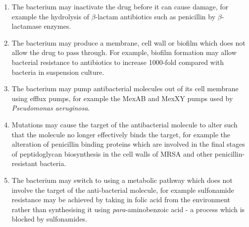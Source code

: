\begin{enumerate}
\item The bacterium may inactivate the drug before it can cause damage, for example the hydrolysis of $\beta$-lactam antibiotics such as penicillin by $\beta$-lactamase enzymes.

\item The bacterium may produce a membrane, cell wall or biofilm which does not allow the drug to pass through. For example, biofilm formation may allow bacterial resistance to antibiotics to increase 1000-fold compared with bacteria in suspension culture\cite{Stewart2001}.

\item The bacterium may pump antibacterial molecules out of its cell membrane using efflux pumps, for example the MexAB and MexXY pumps used by \textit{Pseudomonas aeruginosa}\cite{Poole2004}.

\item Mutations may cause the target of the antibacterial molecule to alter such that the molecule no longer effectively binds the target, for example the alteration of penicillin binding proteins which are involved in the final stages of peptidoglycan biosynthesis in the cell walls of MRSA and other penicillin-resistant bacteria\cite{Fuda2004}.

\item The bacterium may switch to using a metabolic pathway which does not involve the target of the anti\hyp{}bacterial molecule, for example sulfonamide resistance may be achieved by taking in folic acid from the environment rather than synthesising it using \textit{para}-aminobenzoic acid - a process which is blocked by sulfonamides\cite{Skold2000}.

\end{enumerate}

